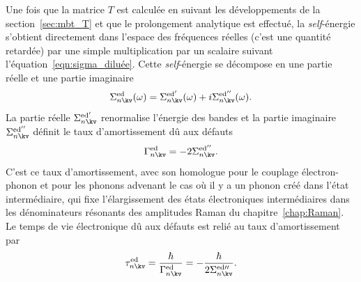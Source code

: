 Une fois que la matrice $T$ est calculée en suivant les développements de la section~\ref{sec:mbt_T} et que le prolongement analytique est effectué, la \textit{self}-énergie s'obtient directement dans l'espace des fréquences réelles (c'est une quantité retardée) par une simple multiplication par un scalaire suivant l'équation~\eqref{eqn:sigma_diluée}. Cette \textit{self}-énergie se décompose en une partie réelle et une partie imaginaire
\begin{equation}
    \Sigma_{n\kv}^\text{ed}(\omega) = \Sigma_{n\kv}^{\text{ed}'}(\omega) + i\Sigma_{n\kv}^{\text{ed}''}(\omega).
\end{equation}
La partie réelle $\Sigma_{n\kv}^{\text{ed}'}$ renormalise l'énergie des bandes et la partie imaginaire $\Sigma_{n\kv}^{\text{ed}''}$ définit le taux d'amortissement dû aux défauts
\begin{equation}
\Gamma_{n\kv}^{\text{ed}} = -2\Sigma_{n\kv}^{\text{ed}''}.
\end{equation}
C'est ce taux d'amortissement, avec son homologue pour le couplage électron-phonon et pour les phonons advenant le cas où il y a un phonon créé dans l'état intermédiaire, qui fixe l'élargissement des états électroniques intermédiaires dans les dénominateurs résonants des amplitudes Raman du chapitre~\ref{chap:Raman}. Le temps de vie électronique dû aux défauts est relié au taux d'amortissement par
\begin{equation}
    \tau^\text{ed}_{n\kv} = \frac{\hbar}{\Gamma^\text{ed}_{n\kv}} = -\frac{\hbar}{2\Sigma^{\text{ed}\prime\prime}_{n\kv}}.
\end{equation}

